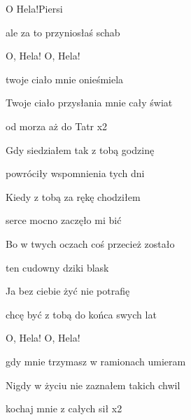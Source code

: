 \begin{song}{O Hela!}{}{}{Piersi}{}{}
\begin{SBVerse}
    ale za to przyniosłaś schab
  \end{SBVerse}
  \begin{SBChorus}
    O, Hela! O, Hela!

    twoje ciało mnie onieśmiela

    Twoje ciało przysłania mnie cały świat

    od morza aż do Tatr x2
  \end{SBChorus}
  \begin{SBVerse}
    Gdy siedziałem tak z tobą godzinę

    powróciły wspomnienia tych dni

    Kiedy z tobą za rękę chodziłem

    serce mocno zaczęło mi bić
  \end{SBVerse}
  \begin{SBVerse}
    Bo w twych oczach coś przecież zostało

    ten cudowny dziki blask

    Ja bez ciebie żyć nie potrafię

    chcę być z tobą do końca swych lat
  \end{SBVerse}
  \begin{SBChorus}
    O, Hela! O, Hela!

    gdy mnie trzymasz w ramionach umieram

    Nigdy w życiu nie zaznałem takich chwil

    kochaj mnie z całych sił x2
  \end{SBChorus}
\end{song}
